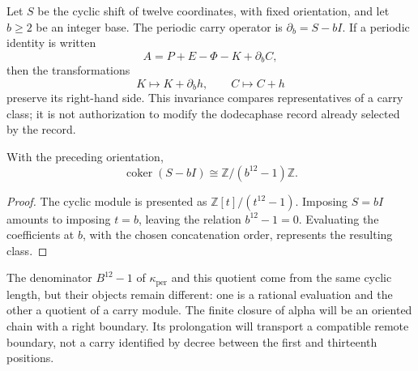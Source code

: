 Let \(S\) be the cyclic shift of twelve coordinates, with fixed
orientation, and let \(b\geq2\) be an integer base. The periodic carry
operator is \(\partial_b=S-bI\). If a periodic identity is written
\[
 A=P+E-\Phi-K+\partial_bC,
\]
then the transformations
\[
 K\longmapsto K+\partial_bh,\qquad C\longmapsto C+h
\]
preserve its right-hand side. This invariance compares representatives of a
carry class; it is not authorization to modify the dodecaphase record already
selected by the record.

\begin{proposition}
\label{prop:k-cociente-acarreo}
With the preceding orientation,
\[
 \operatorname{coker}(S-bI)\cong\mathbb Z/(b^{12}-1)\mathbb Z.
\]
\end{proposition}

\begin{proof}
The cyclic module is presented as
\(\mathbb Z[t]/(t^{12}-1)\). Imposing \(S=bI\) amounts to imposing
\(t=b\), leaving the relation \(b^{12}-1=0\). Evaluating the
coefficients at \(b\), with the chosen concatenation order, represents
the resulting class.
\end{proof}

The denominator \(B^{12}-1\) of \(\kappa_{\mathrm{per}}\) and this
quotient come from the same cyclic length, but their objects remain
different: one is a rational evaluation and the other a quotient
of a carry module. The finite closure of alpha will be an oriented
chain with a right boundary. Its prolongation will transport a
compatible remote boundary, not a carry identified by decree
between the first and thirteenth positions.
